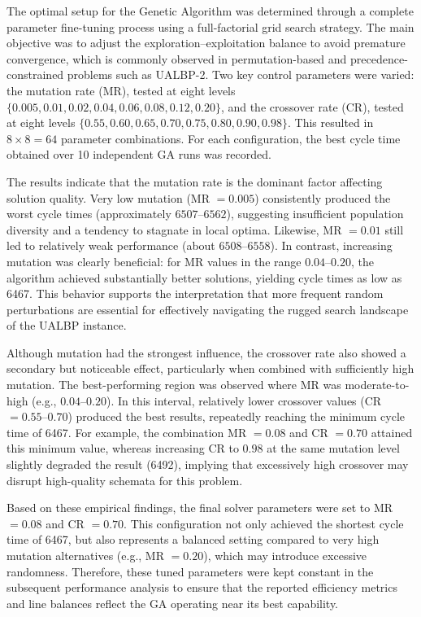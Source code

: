 \documentclass[12pt,a4paper]{article}
\begin{document}
The optimal setup for the Genetic Algorithm was determined through a complete parameter fine-tuning process using a full-factorial grid search strategy. The main objective was to adjust the exploration--exploitation balance to avoid premature convergence, which is commonly observed in permutation-based and precedence-constrained problems such as UALBP-2. Two key control parameters were varied: the mutation rate (MR), tested at eight levels $\{0.005, 0.01, 0.02, 0.04, 0.06, 0.08, 0.12, 0.20\}$, and the crossover rate (CR), tested at eight levels $\{0.55, 0.60, 0.65, 0.70, 0.75, 0.80, 0.90, 0.98\}$. This resulted in $8 \times 8 = 64$ parameter combinations. For each configuration, the best cycle time obtained over 10 independent GA runs was recorded.

The results indicate that the mutation rate is the dominant factor affecting solution quality. Very low mutation (MR $=0.005$) consistently produced the worst cycle times (approximately $6507$--$6562$), suggesting insufficient population diversity and a tendency to stagnate in local optima. Likewise, MR $=0.01$ still led to relatively weak performance (about $6508$--$6558$). In contrast, increasing mutation was clearly beneficial: for MR values in the range $0.04$--$0.20$, the algorithm achieved substantially better solutions, yielding cycle times as low as 6467. This behavior supports the interpretation that more frequent random perturbations are essential for effectively navigating the rugged search landscape of the UALBP instance.

Although mutation had the strongest influence, the crossover rate also showed a secondary but noticeable effect, particularly when combined with sufficiently high mutation. The best-performing region was observed where MR was moderate-to-high (e.g., $0.04$--$0.20$). In this interval, relatively lower crossover values (CR $=0.55$--$0.70$) produced the best results, repeatedly reaching the minimum cycle time of 6467. For example, the combination MR $=0.08$ and CR $=0.70$ attained this minimum value, whereas increasing CR to $0.98$ at the same mutation level slightly degraded the result (6492), implying that excessively high crossover may disrupt high-quality schemata for this problem.

Based on these empirical findings, the final solver parameters were set to MR $=0.08$ and CR $=0.70$. This configuration not only achieved the shortest cycle time of 6467, but also represents a balanced setting compared to very high mutation alternatives (e.g., MR $=0.20$), which may introduce excessive randomness. Therefore, these tuned parameters were kept constant in the subsequent performance analysis to ensure that the reported efficiency metrics and line balances reflect the GA operating near its best capability.
\end{document}
